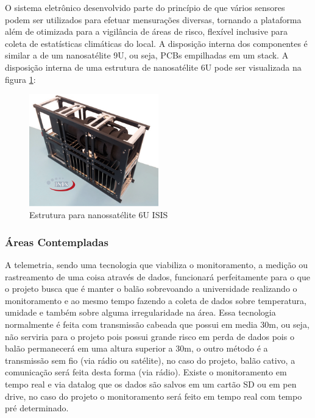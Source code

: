 
O sistema eletrônico desenvolvido parte do princípio de que vários sensores podem ser utilizados para efetuar mensurações diversas, tornando a plataforma além de otimizada para a vigilância de áreas de risco, flexível inclusive para  coleta de estatísticas climáticas do local. A disposição interna dos componentes é similar a de um nanosatélite 9U, ou seja, PCBs empilhadas em um stack. A disposição interna de uma estrutura de nanosatélite 6U pode ser visualizada na figura \ref{img:nanosatelite}:

	\begin{figure}[H]
		\centering
		\includegraphics[width=0.5\textwidth]{figuras/nano}
		\caption{Estrutura para nanossatélite 6U ISIS }
		\label{img:nanosatelite}
	\end{figure}

\subsubsection{Áreas Contempladas} %
\label{sub:_reas_contempladas}


	A telemetria, sendo uma tecnologia que viabiliza o monitoramento, a medição ou rastreamento de uma coisa através de dados, funcionará perfeitamente para o que o projeto busca que é manter o balão sobrevoando a universidade realizando o monitoramento e ao mesmo tempo fazendo a coleta de dados sobre temperatura, umidade e também sobre alguma irregularidade na área. Essa tecnologia normalmente é feita com transmissão cabeada que possui em media 30m, ou seja, não serviria para o projeto pois possui grande risco em perda de dados pois o balão permanecerá em uma altura superior a 30m, o outro método é a transmissão sem fio (via rádio ou satélite), no caso do projeto, balão cativo, a comunicação será feita desta forma (via rádio). Existe o monitoramento em tempo real e via datalog que os dados são salvos em um cartão SD ou em pen drive, no caso do projeto o monitoramento será feito em tempo real com tempo pré determinado.
	
